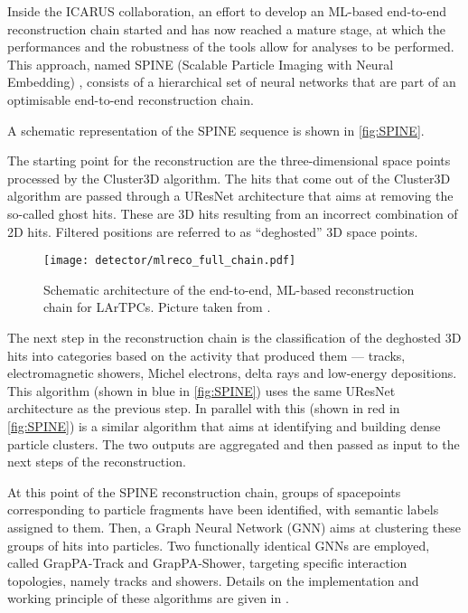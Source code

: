 Inside the ICARUS collaboration, an effort to develop an ML-based end-to-end reconstruction chain started and has now reached a mature stage, at which the performances and the robustness of the tools allow for analyses to be performed. This approach, named SPINE (Scalable Particle Imaging with Neural Embedding) \cite{Drielsma:2021jdv}, consists of a hierarchical set of neural networks that are part of an optimisable end-to-end reconstruction chain.

A schematic representation of the SPINE sequence is shown in \autoref{fig:SPINE}. 

The starting point for the reconstruction are the three-dimensional space points processed by the Cluster3D algorithm. The hits that come out of the Cluster3D algorithm are passed through a UResNet architecture that aims at removing the so-called ghost hits. These are 3D hits resulting from an incorrect combination of 2D hits. Filtered positions are referred to as ``deghosted'' 3D space points. 

\begin{figure}
    \centering
    \texttt{[image: detector/mlreco\_full\_chain.pdf]}
    \caption[SPINE end-to-end machine learning approach]{Schematic architecture of the end-to-end, ML-based reconstruction chain for LArTPCs. Picture taken from \cite{Drielsma:2021jdv}. }
    \label{fig:SPINE}
\end{figure}

The next step in the reconstruction chain is the classification of the deghosted 3D hits into categories based on the activity that produced them --- tracks, electromagnetic showers, Michel electrons, delta rays and low-energy depositions. This algorithm (shown in blue in \autoref{fig:SPINE}) uses the same UResNet architecture as the previous step. In parallel with this (shown in red in \autoref{fig:SPINE}) is a similar algorithm that aims at identifying and building dense particle clusters. The two outputs are aggregated and then passed as input to the next steps of the reconstruction. 


At this point of the SPINE reconstruction chain, groups of spacepoints corresponding to particle fragments have been identified, with semantic labels assigned to them. Then, a Graph Neural Network (GNN) aims at clustering these groups of hits into particles. Two functionally identical GNNs are employed, called GrapPA-Track and GrapPA-Shower, targeting specific interaction topologies, namely tracks and showers. Details on the implementation and working principle of these algorithms are given in \cite{Drielsma:2021jdv}. 

